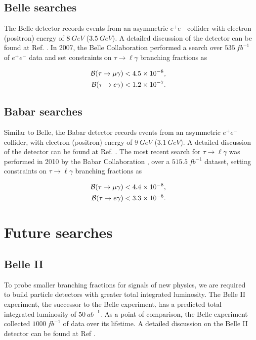 \documentclass[12pt]{thesis}  %
\newcommand{\br}{\mathcal{B}}
\newcommand{\tmg}{\tau\to\mu\gamma}
\newcommand{\tlg}{\tau\to\ell\gamma}
\begin{document}
\subsection{Belle searches}


The Belle detector records events from an asymmetric $e^+ e^-$ collider with electron (positron) energy of $\SI{8}{GeV}$ ($\SI{3.5}{GeV}$). A detailed discussion of the detector can be found at Ref. \cite{Belle:2002}. In 2007, the Belle Collaboration performed a search over $\SI{535}{fb^{-1}}$ of $e^+ e^-$ data and set constraints \cite{Hayasaka:2007} on $\tlg$ branching fractions as

\begin{align}
\br(\tmg)&<\num{4.5d-8},\\
\br(\tau\to e \gamma)&<\num{1.2d-7}.
\end{align}


\subsection{Babar searches}

Similar to Belle, the Babar detector records events from an asymmetric $e^+e^-$ collider, with electron (positron) energy of $\SI{9}{GeV}$ ($\SI{3.1}{GeV}$). A detailed discussion of the detector can be found at Ref. \cite{Babar:2002}. The most recent search for $\tlg$ was performed in 2010 by the Babar Collaboration \cite{Babar:2010}, over a $\SI{515.5}{fb^{-1}}$ dataset, setting constraints on $\tlg$ branching fractions as

\begin{align}
\br(\tmg)&<\num{4.4d-8},\\
\br(\tau\to e \gamma)&<\num{3.3d-8}.
\end{align}



\section{Future searches}

\subsection{Belle II}

To probe smaller branching fractions for signals of new physics, we are required to build particle detectors with greater total integrated luminosity. The Belle II experiment, the successor to the Belle experiment, has a predicted total integrated luminosity of $\SI{50}{ab^{-1}}$. As a point of comparison, the Belle experiment collected $\SI{1000}{fb^{-1}}$ of data over its lifetime. A detailed discussion on the Belle II detector can be found at Ref \cite{Belle:2010}.
\end{document}
